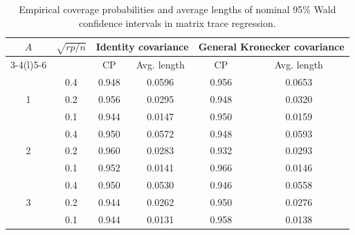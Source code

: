 \begin{table}[!htbp]
\centering
\caption{Empirical coverage probabilities and average lengths of nominal 95\% Wald confidence intervals in matrix trace regression.}
\label{tab:cp-ci-sd1-combined}
\begin{threeparttable}
\setlength{\tabcolsep}{6pt}
\renewcommand{\arraystretch}{1.05}
\begin{tabular}{cc|cc|cc}
\toprule
\multirow{2}{*}{$A$} & \multirow{2}{*}{$\sqrt{rp/n}$} & \multicolumn{2}{c|}{Identity covariance} & \multicolumn{2}{c}{General Kronecker covariance} \\
\cmidrule(lr){3-4}\cmidrule(l){5-6}
 &  & CP & Avg. length & CP & Avg. length \\
\midrule
\multirow{3}{*}{1}
 & 0.4  & 0.948 & 0.0596 & 0.956 & 0.0653 \\
 & 0.2  & 0.956 & 0.0295 & 0.948 & 0.0320 \\
 & 0.1  & 0.944 & 0.0147 & 0.950 & 0.0159 \\
\midrule
\multirow{3}{*}{2}
 & 0.4  & 0.950 & 0.0572 & 0.948 & 0.0593 \\
 & 0.2  & 0.960 & 0.0283 & 0.932 & 0.0293 \\
 & 0.1  & 0.952 & 0.0141 & 0.966 & 0.0146 \\
\midrule
\multirow{3}{*}{3}
 & 0.4  & 0.950 & 0.0530 & 0.946 & 0.0558 \\
 & 0.2  & 0.944 & 0.0262 & 0.950 & 0.0276 \\
 & 0.1  & 0.944 & 0.0131 & 0.958 & 0.0138 \\
\bottomrule
\end{tabular}
\end{threeparttable}
\end{table}
